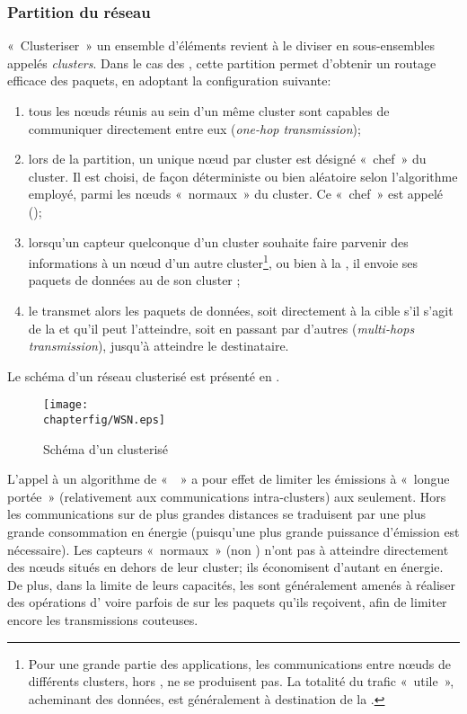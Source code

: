         \subsubsection{Partition du réseau}
«~Clusteriser~» un ensemble d'éléments revient à le diviser en sous-ensembles appelés \textit{clusters}.
Dans le cas des \rcsfs, cette partition permet d'obtenir un routage efficace des paquets, en adoptant la configuration suivante:
\begin{enumerate}
    \item tous les nœuds réunis au sein d'un même cluster sont capables de communiquer directement entre eux (\textit{one-hop transmission});
    \item lors de la partition, un unique nœud par cluster est désigné «~chef~» du cluster.
        Il est choisi, de façon déterministe ou bien aléatoire selon l'algorithme employé, parmi les nœuds «~normaux~» du cluster.
        Ce «~chef~» est appelé \ch (\CH);
    \item lorsqu'un capteur quelconque d'un cluster souhaite faire parvenir des informations à un nœud d'un autre cluster\footnote{Pour une grande partie des applications, les communications entre nœuds de différents clusters, hors \chs, ne se produisent pas. La totalité du trafic «~utile~», acheminant des données, est généralement à destination de la \sdb.}, ou bien à la \sdb, il envoie ses paquets de données au \ch de son cluster ;
    \item le \ch transmet alors les paquets de données, soit directement à la cible s'il s'agit de la \sdb et qu'il peut l'atteindre, soit en passant par d'autres \chs (\textit{multi-hops transmission}), jusqu'à atteindre le destinataire.
\end{enumerate}
Le schéma d'un réseau clusterisé est présenté en .
\begin{figure}
    \centering
    \texttt{[image: \\chapterfig/WSN.eps]}
    \caption{Schéma d'un \rc clusterisé}\label{st:fig:wsn}
\end{figure}
L'appel à un algorithme de «  » a pour effet de limiter les émissions à «~longue portée~» (relativement aux communications intra-clusters) aux \chs seulement.
Hors les communications sur de plus grandes distances se traduisent par une plus grande consommation en énergie (puisqu'une plus grande puissance d'émission est nécessaire).
Les capteurs «~normaux~» (non \chs) n'ont pas à atteindre directement des nœuds situés en dehors de leur cluster; ils économisent d'autant en énergie.
De plus, dans la limite de leurs capacités, les \chs sont généralement amenés à réaliser des opérations d' voire parfois de  sur les paquets qu'ils reçoivent, afin de limiter encore les transmissions couteuses.

